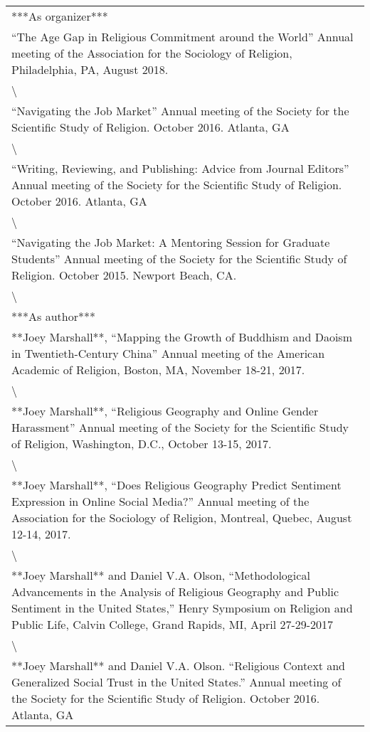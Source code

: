\documentclass[
]{article}
\begin{document}
\begin{tabular}{l}
\hline
\\
\hline
***As organizer***\\
\hline
“The Age Gap in Religious Commitment around the World” Annual meeting of the Association for the Sociology of Religion, Philadelphia, PA, August 2018.\\
\hline
\textbackslash{}\\
\hline
“Navigating the Job Market” Annual meeting of the Society for the Scientific Study of Religion. October 2016. Atlanta, GA\\
\hline
\textbackslash{}\\
\hline
“Writing, Reviewing, and Publishing: Advice from Journal Editors” Annual meeting of the Society for the Scientific Study of Religion. October 2016. Atlanta, GA\\
\hline
\textbackslash{}\\
\hline
“Navigating the Job Market: A Mentoring Session for Graduate Students” Annual meeting of the Society for the Scientific Study of Religion. October 2015. Newport Beach, CA.\\
\hline
\textbackslash{}\\
\hline
***As author***\\
\hline
**Joey Marshall**, “Mapping the Growth of Buddhism and Daoism in Twentieth-Century China” Annual meeting of the American Academic of Religion, Boston, MA, November 18-21, 2017.\\
\hline
\textbackslash{}\\
\hline
**Joey Marshall**, “Religious Geography and Online Gender Harassment” Annual meeting of the Society for the Scientific Study of Religion, Washington, D.C., October 13-15, 2017.\\
\hline
\textbackslash{}\\
\hline
**Joey Marshall**, “Does Religious Geography Predict Sentiment Expression in Online Social Media?” Annual meeting of the Association for the Sociology of Religion, Montreal, Quebec, August 12-14, 2017.\\
\hline
\textbackslash{}\\
\hline
**Joey Marshall** and Daniel V.A. Olson, “Methodological Advancements in the Analysis of Religious Geography and Public Sentiment in the United States,” Henry Symposium on Religion and Public Life, Calvin College, Grand Rapids, MI, April 27-29-2017\\
\hline
\textbackslash{}\\
\hline
**Joey Marshall** and Daniel V.A. Olson. “Religious Context and Generalized Social Trust in the United States.” Annual meeting of the Society for the Scientific Study of Religion. October 2016. Atlanta, GA\\

\end{tabular}
\end{document}

